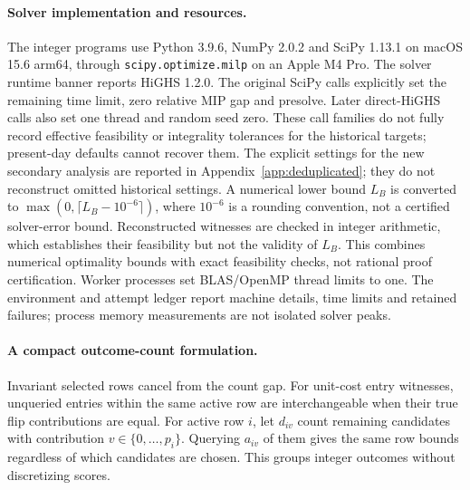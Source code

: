 \paragraph{Solver implementation and resources.}
The integer programs use Python 3.9.6, NumPy 2.0.2 and SciPy 1.13.1 on macOS 15.6 arm64, through \texttt{scipy.optimize.milp} on an Apple M4 Pro. The solver runtime banner reports HiGHS 1.2.0. The original SciPy calls explicitly set the remaining time limit, zero relative MIP gap and presolve. Later direct-HiGHS calls also set one thread and random seed zero. These call families do not fully record effective feasibility or integrality tolerances for the historical targets; present-day defaults cannot recover them. The explicit settings for the new secondary analysis are reported in Appendix~\ref{app:deduplicated}; they do not reconstruct omitted historical settings. A numerical lower bound $L_B$ is converted to $\max(0,\lceil L_B-10^{-6}\rceil)$, where $10^{-6}$ is a rounding convention, not a certified solver-error bound. Reconstructed witnesses are checked in integer arithmetic, which establishes their feasibility but not the validity of $L_B$. This combines numerical optimality bounds with exact feasibility checks, not rational proof certification. Worker processes set BLAS/OpenMP thread limits to one. The environment and attempt ledger report machine details, time limits and retained failures; process memory measurements are not isolated solver peaks.

\paragraph{A compact outcome-count formulation.}
\label{app:compact-joint}
Invariant selected rows cancel from the count gap. For unit-cost entry witnesses, unqueried entries within the same active row are interchangeable when their true flip contributions are equal. For active row $i$, let $d_{iv}$ count remaining candidates with contribution $v\in\{0,\ldots,p_i\}$. Querying $a_{iv}$ of them gives the same row bounds regardless of which candidates are chosen. This groups integer outcomes without discretizing scores.

